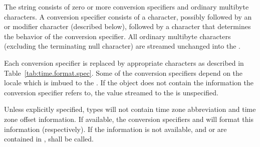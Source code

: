 \pnum
The  string consists of zero or more conversion specifiers
and ordinary multibyte characters.
A conversion specifier consists of
a \tcode{\%} character,
possibly followed by an  or  modifier character (described below),
followed by a character that determines the behavior of the conversion specifier.
All ordinary multibyte characters (excluding the terminating null character)
are streamed unchanged into the .

\pnum
Each conversion specifier is replaced by appropriate characters
as described in Table~\ref{tab:time.format.spec}.
Some of the conversion specifiers
depend on the locale which is imbued to the .
If the  object does not contain
the information the conversion specifier refers to,
the value streamed to the  is unspecified.

\pnum
Unless explicitly specified,
 types will not contain time zone abbreviation
and time zone offset information.
If available,
the conversion specifiers  and 
will format this information (respectively).
If the information is not available,
and  or  are contained in ,
 shall be called.

